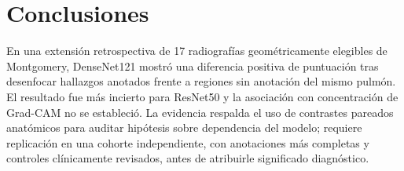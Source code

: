 \documentclass[conference]{IEEEtran}
\begin{document}
\section{Conclusiones}
En una extensión retrospectiva de 17 radiografías geométricamente elegibles de Montgomery, DenseNet121 mostró una diferencia positiva de puntuación tras desenfocar hallazgos anotados frente a regiones sin anotación del mismo pulmón. El resultado fue más incierto para ResNet50 y la asociación con concentración de Grad-CAM no se estableció. La evidencia respalda el uso de contrastes pareados anatómicos para auditar hipótesis sobre dependencia del modelo; requiere replicación en una cohorte independiente, con anotaciones más completas y controles clínicamente revisados, antes de atribuirle significado diagnóstico.



\end{document}
